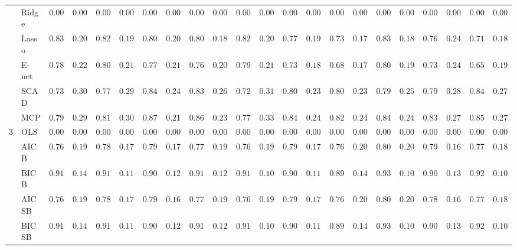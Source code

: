 \begin{tabular}{p{0.2cm}p{1cm}|p{0.6cm}p{0.6cm}|p{0.6cm}p{0.6cm}p{0.6cm}p{0.6cm}p{0.6cm}p{0.6cm}|p{0.6cm}p{0.6cm}p{0.6cm}p{0.6cm}p{0.6cm}p{0.6cm}|p{0.6cm}p{0.6cm}p{0.6cm}p{0.6cm}p{0.6cm}p{0.6cm}}
 & Ridge  & $0.0000$ & $0.0000$ & $0.0000$ & $0.0000$ & $0.0000$ & $0.0000$ & $0.0000$ & $0.0000$ & $0.0000$ & $0.0000$ & $0.0000$ & $0.0000$ & $0.0000$ & $0.0000$ & $0.0000$ & $0.0000$ & $0.0000$ & $0.0000$ & $0.0000$ & $0.0000$ \\
 & Lasso  & $0.8317$ & $0.2072$ & $0.8283$ & $0.1946$ & $0.8067$ & $0.2075$ & $0.8050$ & $0.1881$ & $0.8250$ & $0.2084$ & $0.7717$ & $0.1991$ & $0.7367$ & $0.1776$ & $0.8367$ & $0.1804$ & $0.7683$ & $0.2403$ & $0.7117$ & $0.1878$ \\
 & E-net  & $0.7867$ & $0.2261$ & $0.8000$ & $0.2132$ & $0.7767$ & $0.2108$ & $0.7667$ & $0.2079$ & $0.7950$ & $0.2104$ & $0.7333$ & $0.1895$ & $0.6883$ & $0.1751$ & $0.8000$ & $0.1953$ & $0.7333$ & $0.2416$ & $0.6550$ & $0.1957$ \\
 & SCAD  & $0.7383$ & $0.3091$ & $0.7750$ & $0.2905$ & $0.8417$ & $0.2432$ & $0.8367$ & $0.2669$ & $0.7283$ & $0.3184$ & $0.8050$ & $0.2322$ & $0.8067$ & $0.2389$ & $0.7967$ & $0.2558$ & $0.7950$ & $0.2821$ & $0.8433$ & $0.2709$ \\
 & MCP  & $0.7967$ & $0.2955$ & $0.8133$ & $0.3055$ & $0.8783$ & $0.2130$ & $0.8600$ & $0.2342$ & $0.7700$ & $0.3331$ & $0.8450$ & $0.2499$ & $0.8233$ & $0.2460$ & $0.8483$ & $0.2405$ & $0.8333$ & $0.2773$ & $0.8533$ & $0.2714$ \\\hline
3 & OLS  & $0.0000$ & $0.0000$ & $0.0000$ & $0.0000$ & $0.0000$ & $0.0000$ & $0.0000$ & $0.0000$ & $0.0000$ & $0.0000$ & $0.0000$ & $0.0000$ & $0.0000$ & $0.0000$ & $0.0000$ & $0.0000$ & $0.0000$ & $0.0000$ & $0.0000$ & $0.0000$ \\
 & AIC B  & $0.7600$ & $0.1929$ & $0.7867$ & $0.1710$ & $0.7967$ & $0.1701$ & $0.7767$ & $0.1942$ & $0.7683$ & $0.1923$ & $0.7933$ & $0.1710$ & $0.7683$ & $0.2064$ & $0.8000$ & $0.2010$ & $0.7917$ & $0.1681$ & $0.7767$ & $0.1838$ \\
 & BIC B  & $0.9133$ & $0.1450$ & $0.9183$ & $0.1124$ & $0.9033$ & $0.1258$ & $0.9100$ & $0.1285$ & $0.9183$ & $0.1019$ & $0.9083$ & $0.1193$ & $0.8900$ & $0.1445$ & $0.9317$ & $0.1062$ & $0.9017$ & $0.1300$ & $0.9233$ & $0.1070$ \\
 & AIC SB  & $0.7600$ & $0.1929$ & $0.7850$ & $0.1713$ & $0.7950$ & $0.1689$ & $0.7767$ & $0.1942$ & $0.7683$ & $0.1923$ & $0.7933$ & $0.1710$ & $0.7683$ & $0.2064$ & $0.8000$ & $0.2010$ & $0.7867$ & $0.1660$ & $0.7767$ & $0.1838$ \\
 & BIC SB  & $0.9133$ & $0.1450$ & $0.9167$ & $0.1124$ & $0.9033$ & $0.1258$ & $0.9100$ & $0.1285$ & $0.9183$ & $0.1019$ & $0.9083$ & $0.1193$ & $0.8900$ & $0.1445$ & $0.9317$ & $0.1062$ & $0.9017$ & $0.1300$ & $0.9217$ & $0.1071$ \\

\end{tabular}

